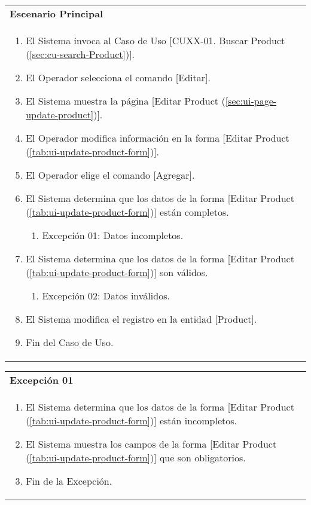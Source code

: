	\begin{tabular}{ p{15.5cm} }
		\textbf{Escenario Principal} \\
		\begin{enumerate}
			\item El Sistema invoca al Caso de Uso [CUXX-01. Buscar Product (\ref{sec:cu-search-Product})].
			\item El Operador selecciona el comando [Editar].
			\item El Sistema muestra la p\'agina [Editar Product (\ref{sec:ui-page-update-product})].
			\item El Operador modifica informaci\'on en la forma [Editar Product (\ref{tab:ui-update-product-form})].
			\item El Operador elige el comando [Agregar].
			\item El Sistema determina que los datos de la forma [Editar Product (\ref{tab:ui-update-product-form})] est\'an completos.
				\begin{enumerate}
					\item Excepci\'on 01: Datos incompletos.
				\end{enumerate}
			\item El Sistema determina que los datos de la forma [Editar Product (\ref{tab:ui-update-product-form})] son v\'alidos.
				\begin{enumerate}
					\item Excepci\'on 02: Datos inv\'alidos.
				\end{enumerate}
			\item El Sistema modifica el registro en la entidad [Product].
			\item Fin del Caso de Uso.
		\end{enumerate}
	\end{tabular}
	
	\begin{tabular}{ p{15.5cm} }
		\textbf{Excepci\'on 01} \\
		\begin{enumerate}
			\item El Sistema determina que los datos de la forma [Editar Product (\ref{tab:ui-update-product-form})] est\'an incompletos.
			\item El Sistema muestra los campos de la forma [Editar Product (\ref{tab:ui-update-product-form})] que son obligatorios.
			\item Fin de la Excepci\'on.
		\end{enumerate}
	\end{tabular}
	
